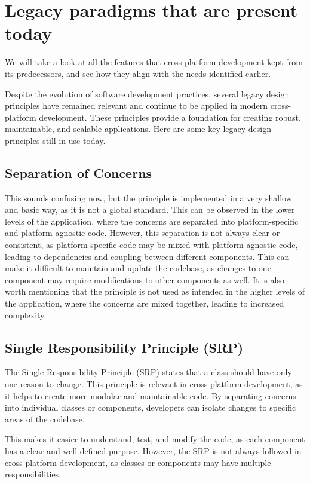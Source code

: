 \section{Legacy paradigms that are present today}
We will take a look at all the features that cross-platform development kept from its predecessors, and see how they align with the needs identified earlier.

\par
Despite the evolution of software development practices, several legacy design principles have remained relevant and continue to be applied in modern cross-platform development. 
These principles provide a foundation for creating robust, maintainable, and scalable applications. 
Here are some key legacy design principles still in use today.

\subsection{Separation of Concerns} 
This sounds confusing now, but the principle is implemented in a very shallow and basic way, as it is not a global standard.
This can be observed in the lower levels of the application, where the concerns are separated into platform-specific and platform-agnostic code.
However, this separation is not always clear or consistent, as platform-specific code may be mixed with platform-agnostic code, leading to dependencies and coupling between different components.
This can make it difficult to maintain and update the codebase, as changes to one component may require modifications to other components as well.
It is also worth mentioning that the principle is not used as intended in the higher levels of the application, where the concerns are mixed together, leading to increased complexity.

\subsection{Single Responsibility Principle (SRP)}
The Single Responsibility Principle (SRP) states that a class should have only one reason to change.
This principle is relevant in cross-platform development, as it helps to create more modular and maintainable code.
By separating concerns into individual classes or components, developers can isolate changes to specific areas of the codebase.
\par
This makes it easier to understand, test, and modify the code, as each component has a clear and well-defined purpose.
However, the SRP is not always followed in cross-platform development, as classes or components may have multiple responsibilities.

